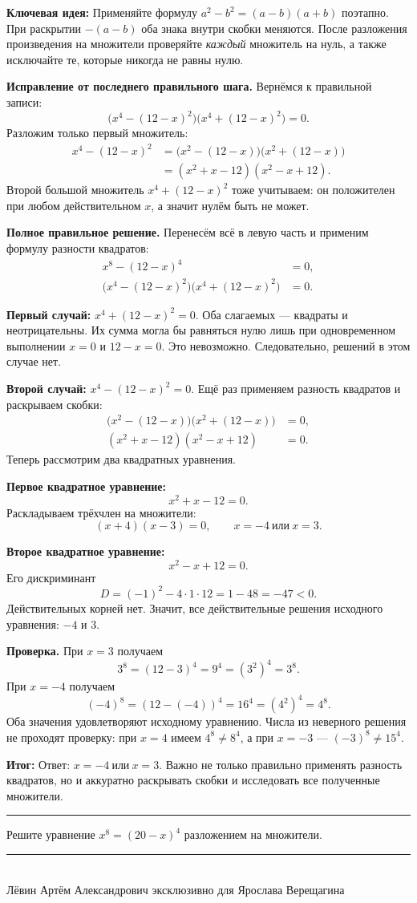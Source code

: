 \documentclass[a4paper,12pt]{article}
\newcommand{\tealheading}[1]{\par\needspace{4\baselineskip}\vspace{9pt}\noindent{\large\color{tealshade}#1}\par\vspace{3pt}\noindent\textcolor{tealshade}{\rule{\linewidth}{0.35pt}}\par\vspace{2pt}}
\newcommand{\subfield}[1]{\par\needspace{3\baselineskip}\textbf{#1}\quad}
\newcommand{\ideafield}{\par\needspace{3\baselineskip}\textcolor{softblue}{\textbf{Ключевая идея:}}\quad}
\newcommand{\resultfield}{\par\needspace{3\baselineskip}\textcolor{tealshade}{\textbf{Итог:}}\quad}
\begin{document}
\ideafield
Применяйте формулу $a^2-b^2=(a-b)(a+b)$ поэтапно. При раскрытии $-(a-b)$ оба знака внутри скобки меняются. После разложения произведения на множители проверяйте \emph{каждый} множитель на нуль, а также исключайте те, которые никогда не равны нулю.

\subfield{Исправление от последнего правильного шага.}
Вернёмся к правильной записи:
\[
\bigl(x^4-(12-x)^2\bigr)
\bigl(x^4+(12-x)^2\bigr)=0.
\]
Разложим только первый множитель:
\begin{align*}
x^4-(12-x)^2
&=\bigl(x^2-(12-x)\bigr)\bigl(x^2+(12-x)\bigr)\\
&=(x^2+x-12)(x^2-x+12).
\end{align*}
Второй большой множитель $x^4+(12-x)^2$ тоже учитываем: он положителен при любом действительном $x$, а значит нулём быть не может.

\subfield{Полное правильное решение.}
Перенесём всё в левую часть и применим формулу разности квадратов:
\begin{align*}
x^8-(12-x)^4&=0,\\
\bigl(x^4-(12-x)^2\bigr)
\bigl(x^4+(12-x)^2\bigr)&=0.
\end{align*}

\textbf{Первый случай:} $x^4+(12-x)^2=0$.
Оба слагаемых — квадраты и неотрицательны. Их сумма могла бы равняться нулю лишь при одновременном выполнении $x=0$ и $12-x=0$. Это невозможно. Следовательно, решений в этом случае нет.

\textbf{Второй случай:} $x^4-(12-x)^2=0$.
Ещё раз применяем разность квадратов и раскрываем скобки:
\begin{align*}
\bigl(x^2-(12-x)\bigr)\bigl(x^2+(12-x)\bigr)&=0,\\
(x^2+x-12)(x^2-x+12)&=0.
\end{align*}
Теперь рассмотрим два квадратных уравнения.

\textbf{Первое квадратное уравнение:}
\[
x^2+x-12=0.
\]
Раскладываем трёхчлен на множители:
\[
(x+4)(x-3)=0,
\qquad x=-4\ \text{или}\ x=3.
\]

\textbf{Второе квадратное уравнение:}
\[
x^2-x+12=0.
\]
Его дискриминант
\[
D=(-1)^2-4\cdot1\cdot12=1-48=-47<0.
\]
Действительных корней нет. Значит, все действительные решения исходного уравнения: $-4$ и $3$.

\subfield{Проверка.}
При $x=3$ получаем
\[
3^8=(12-3)^4=9^4=(3^2)^4=3^8.
\]
При $x=-4$ получаем
\[
(-4)^8=(12-(-4))^4=16^4=(4^2)^4=4^8.
\]
Оба значения удовлетворяют исходному уравнению. Числа из неверного решения не проходят проверку: при $x=4$ имеем $4^8\ne8^4$, а при $x=-3$ — $(-3)^8\ne15^4$.

\resultfield
Ответ: $\boxed{x=-4\ \text{или}\ x=3}$. Важно не только правильно применять разность квадратов, но и аккуратно раскрывать скобки и исследовать все полученные множители.

\tealheading{Задача на закрепление}
Решите уравнение $x^8=(20-x)^4$ разложением на множители.

\vfill
\begin{center}
\textcolor{tealshade}{\rule{0.42\linewidth}{0.45pt}}\\[6pt]
{\footnotesize Лёвин Артём Александрович эксклюзивно для Ярослава Верещагина}
\end{center}
\end{document}
